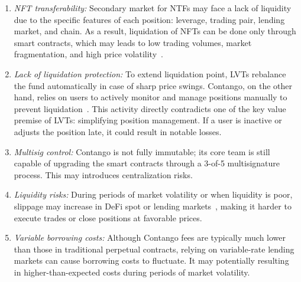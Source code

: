 \begin{enumerate}[label={\ref{subsec:contango}.\arabic*},leftmargin=*]
	\item \textit{NFT transferability:} Secondary market for NTFs may face a lack of liquidity due to the specific features of each position: leverage, trading pair, lending market, and chain. As a result, liquidation of NFTs can be done only through smart contracts, which may leads to low trading volumes, market fragmentation, and high price volatility~\cite{seyhan2023nft}.
	
	\item \textit{Lack of liquidation protection:} To extend liquidation point, LVTs rebalance the fund automatically in case of sharp price swings. Contango, on the other hand, relies on users to actively monitor and manage positions manually to prevent liquidation~\cite{Contango_Faq}. This activity directly contradicts one of the key value premise of LVTs: simplifying position management. If a user is inactive or adjusts the position late, it could result in notable losses.	
	
	\item \textit{Multisig control:} Contango is not fully immutable; its core team is still capable of upgrading the smart contracts through a 3-of-5 multisignature process. This may introduces centralization risks.
	
	\item \textit{Liquidity risks:} During periods of market volatility or when liquidity is poor, slippage may increase in DeFi spot or lending markets~\cite{chiu2023fragility}, making it harder to execute trades or close positions at favorable prices.
	
	\item \textit{Variable borrowing costs:} Although Contango fees are typically much lower than those in traditional perpetual contracts, relying on variable-rate lending markets can cause borrowing costs to fluctuate. It may potentially resulting in higher-than-expected costs during periods of market volatility.
\end{enumerate}

